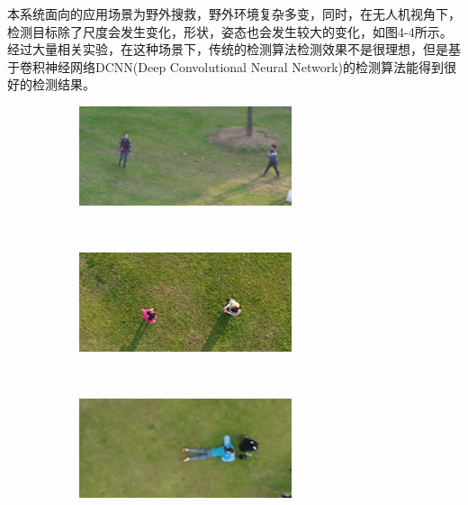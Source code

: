 本系统面向的应用场景为野外搜救，野外环境复杂多变，同时，在无人机视角下，检测目标除了尺度会发生变化，形状，姿态也会发生较大的变化，如图4-4所示。经过大量相关实验，在这种场景下，传统的检测算法检测效果不是很理想，但是基于卷积神经网络DCNN(Deep Convolutional Neural Network)的检测算法能得到很好的检测结果。
\begin{figure}[h]
    \centering
    \begin{subfigure}[h]{0.3\textwidth}
        \includegraphics[width=\textwidth]{figures/目标示例样本1.png}
    \end{subfigure}
    ~
    \begin{subfigure}[h]{0.3\textwidth}
        \includegraphics[width=\textwidth]{figures/目标示例样本2.png}
    \end{subfigure}
    ~
    \begin{subfigure}[h]{0.3\textwidth}
        \includegraphics[width=\textwidth]{figures/目标示例样本3.png}

\end{subfigure}
\end{figure}
